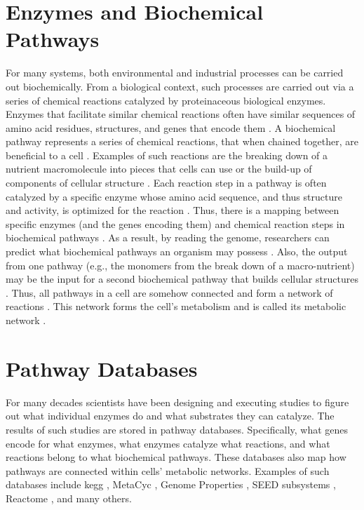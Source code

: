 \section{Enzymes and Biochemical Pathways} \label{enzymes-and-pathways} 

For many systems, both environmental and industrial processes can be carried out 
biochemically. From a biological context, such processes are carried out via a 
series of chemical reactions catalyzed by proteinaceous biological enzymes. 
Enzymes that facilitate similar chemical reactions often 
\cite{galperin1998analogous} have similar sequences of amino acid residues, 
structures, and genes that encode them \cite{zhang2003evolution}. A biochemical 
pathway represents a series of chemical reactions, that when chained together, 
are beneficial to a cell \cite{michal2012biochemical}. Examples of such 
reactions are the breaking down of a nutrient macromolecule into pieces that 
cells can use or the build-up of components of cellular structure 
\cite{wagner2012metabolic}. Each reaction step in a pathway is often 
\cite{keller2015widespread,tawfik2010enzyme} catalyzed by a specific enzyme 
whose amino acid sequence, and thus structure and activity, is optimized for the 
reaction \cite{michal2012biochemical,zhang2003evolution,fersht1999structure}. 
Thus, there is a mapping between specific enzymes (and the genes encoding them) 
and chemical reaction steps in biochemical pathways \cite{thiele2010protocol}. 
As a result, by reading the genome, researchers can predict what biochemical 
pathways an organism may possess 
\cite{abubucker2012metabolic,thiele2010protocol}. Also, the output from one 
pathway (e.g., the monomers from the break down of a macro-nutrient) may be the 
input for a second biochemical pathway that builds cellular structures 
\cite{wagner2012metabolic,stelling2002metabolic}. Thus, all pathways in a cell 
are somehow connected and form a network of reactions 
\cite{wagner2012metabolic,stelling2002metabolic}. This network forms the cell's 
metabolism and is called its metabolic network \cite{wagner2012metabolic}.

\section{Pathway Databases} \label{pathway-databases}

For many decades scientists have been designing and executing studies to figure 
out what individual enzymes do and what substrates they can catalyze. The 
results of such studies are stored in pathway databases. Specifically, what 
genes encode for what enzymes, what enzymes catalyze what reactions, and what 
reactions belong to what biochemical pathways. These databases also map how 
pathways are connected within cells' metabolic networks. Examples of such 
databases include \gls{kegg} \cite{kanehisa2000kegg}, MetaCyc 
\cite{karp2002metacyc}, Genome Properties \cite{richardson2018genome}, SEED 
subsystems \cite{overbeek2005subsystems}, Reactome \cite{croft2013reactome}, and 
many others.

